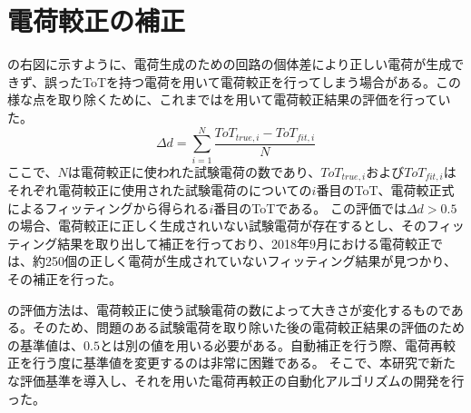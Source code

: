 \section{電荷較正の補正}
\label{sec:calibhosei}
の右図に示すように、電荷生成のための回路の個体差により正しい電荷が生成できず、誤ったToTを持つ電荷を用いて電荷較正を行ってしまう場合がある。この様な点を取り除くために、これまではを用いて電荷較正結果の評価を行っていた。
\begin{equation}
  \label{eq:averagedistance}
  \Delta d = \sum_{i=1}^{N} \frac{ToT_{true, i} - ToT_{fit, i}}{N}
\end{equation}
ここで、$N$は電荷較正に使われた試験電荷の数であり、$ToT_{true, i}$および$ToT_{fit, i}$はそれぞれ電荷較正に使用された試験電荷のについての$i$番目のToT、電荷較正式によるフィッティングから得られる$i$番目のToTである。
この評価では$\Delta d > 0.5$の場合、電荷較正に正しく生成されいない試験電荷が存在するとし、そのフィッティング結果を取り出して補正を行っており、2018年9月における電荷較正では、約250個の正しく電荷が生成されていないフィッティング結果が見つかり、その補正を行った。


の評価方法は、電荷較正に使う試験電荷の数によって大きさが変化するものである。そのため、問題のある試験電荷を取り除いた後の電荷較正結果の評価のための基準値は、$0.5$とは別の値を用いる必要がある。自動補正を行う際、電荷再較正を行う度に基準値を変更するのは非常に困難である。
そこで、本研究で新たな評価基準を導入し、それを用いた電荷再較正の自動化アルゴリズムの開発を行った。


